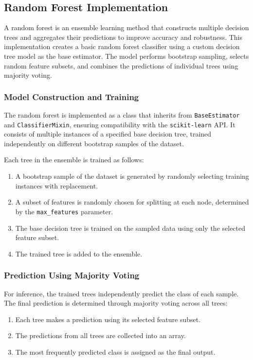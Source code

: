 \documentclass[12pt]{article}
\begin{document}
\subsection{Random Forest Implementation}

A random forest is an ensemble learning method that constructs multiple decision trees and aggregates their predictions to improve accuracy and robustness. This implementation creates a basic random forest classifier using a custom decision tree model as the base estimator. The model performs bootstrap sampling, selects random feature subsets, and combines the predictions of individual trees using majority voting.

\subsubsection{Model Construction and Training}
The random forest is implemented as a class that inherits from \texttt{BaseEstimator} and \texttt{ClassifierMixin}, ensuring compatibility with the \texttt{scikit-learn} API. It consists of multiple instances of a specified base decision tree, trained independently on different bootstrap samples of the dataset.

Each tree in the ensemble is trained as follows:
\begin{enumerate}
    \item A bootstrap sample of the dataset is generated by randomly selecting training instances with replacement.
    \item A subset of features is randomly chosen for splitting at each node, determined by the \texttt{max\_features} parameter.
    \item The base decision tree is trained on the sampled data using only the selected feature subset.
    \item The trained tree is added to the ensemble.
\end{enumerate}

\subsubsection{Prediction Using Majority Voting}
For inference, the trained trees independently predict the class of each sample. The final prediction is determined through majority voting across all trees:
\begin{enumerate}
    \item Each tree makes a prediction using its selected feature subset.
    \item The predictions from all trees are collected into an array.
    \item The most frequently predicted class is assigned as the final output.
\end{enumerate}
\end{document}
